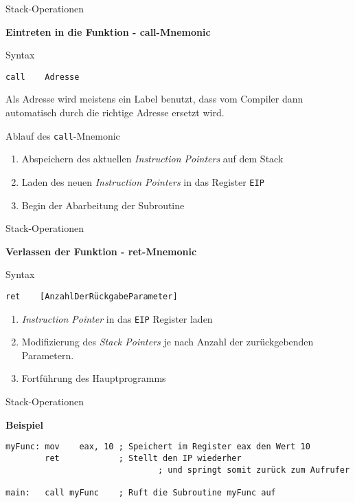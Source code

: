 \begin{frame}[fragile]{Stack-Operationen}

\begin{center}
\textbf{Eintreten in die Funktion - call-Mnemonic}
\end{center}

Syntax
\begin{lstlisting}
call    Adresse
\end{lstlisting}

Als Adresse wird meistens ein Label benutzt, dass vom Compiler dann automatisch durch die richtige Adresse ersetzt wird.

\makebox{}

Ablauf des \texttt{call}-Mnemonic
\begin{enumerate}
	\item Abspeichern des aktuellen \textit{Instruction Pointers} auf dem Stack
	\item Laden des neuen \textit{Instruction Pointers} in das Register \texttt{EIP}
	\item Begin der Abarbeitung der Subroutine	
\end{enumerate}

\end{frame}


\begin{frame}[fragile]{Stack-Operationen}

\begin{center}
\textbf{Verlassen der Funktion - ret-Mnemonic}
\end{center}

Syntax
\begin{lstlisting}
ret    [AnzahlDerRückgabeParameter]
\end{lstlisting}

\makebox

\begin{enumerate}
	\item \textit{Instruction Pointer} in das \texttt{EIP} Register laden
	\item Modifizierung des \textit{Stack Pointers} je nach Anzahl der zurückgebenden Parametern. 
	\item Fortführung des Hauptprogramms 	
\end{enumerate}
\end{frame}


\begin{frame}[fragile]{Stack-Operationen}

\begin{center}
\textbf{Beispiel}
\end{center}

\begin{lstlisting}
myFunc: mov    eax, 10 ; Speichert im Register eax den Wert 10
        ret            ; Stellt den IP wiederher
				               ; und springt somit zurück zum Aufrufer

main:   call myFunc    ; Ruft die Subroutine myFunc auf
\end{lstlisting}
\end{frame}
